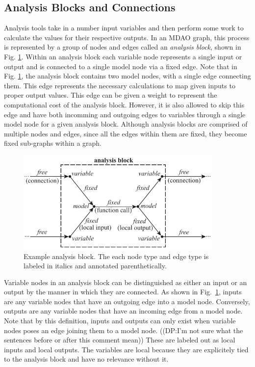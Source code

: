 \subsection{Analysis Blocks and Connections}
	\label{ss:analysis blocks and connections}
	Analysis tools take in a number input variables and then perform some work to calculate 
	the values for their respective outputs. In an MDAO graph, this process is 
	represented by a group of nodes and edges called an \emph{analysis block}, 
	shown in Fig. \ref{f:analysis block}. Within an analysis block each variable 
	node represents a single input or output and is connected 
	to a single model node via a fixed edge. Note that in Fig. \ref{f:analysis block}, 
	the analysis block contains two model nodes, with a single edge connecting them. 
	This edge represents the necessary calculations to map given inputs 
	to proper output values. This edge can be given a weight to represent the computational cost of the analysis block. However, it is also allowed to skip 
	this edge and have both incomming and outgoing edges to variables through a single model 
	node for a given analysis block. Although analysis blocks are comprised of multiple nodes and edges, since all 
	the edges within them are fixed, they become fixed sub-graphs within a graph.
	\begin{figure}[htb!]
		\begin{center}
		\includegraphics[width=4in]{images/analysis_block}
		\end{center}
		\vspace{-10pt}
	\caption{Example analysis block. The each node type and edge type is labeled in italics and annotated parenthetically.}
	\label{f:analysis block}
	\end{figure}

	Variable nodes in an analysis block can be distinguished as either an input or an output by the manner in which they are connected. As shown in Fig.~\ref{f:analysis block}, inputs are any variable nodes that have an outgoing edge into a model 
	node. Conversely, outputs are any variable nodes that have an incoming edge from a model node. 
	Note that by this definition, inputs and outputs can only exist when variable nodes poses an 
	edge joining them to a model node. 
	((DP:I'm not sure what the sentences before or after this comment mean))
	These are labeled out as 
	local inputs and local outputs. The variables are local because they are explicitely tied
	to the analysis block and have no relevance without it. 

